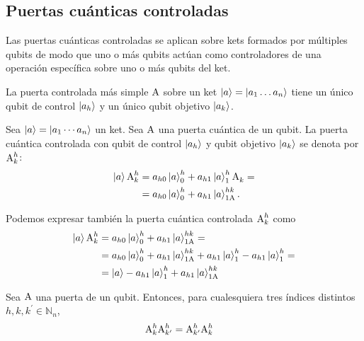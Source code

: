 \subsection{Puertas cuánticas controladas}
Las puertas cuánticas controladas se aplican sobre kets formados por múltiples qubits de modo que uno o más qubits actúan como controladores de una operación específica sobre uno o más qubits del ket.

La puerta controlada más simple $\text{A}$ sobre un ket $\ket{a}=\ket{a_1\dots a_n}$ tiene un único qubit de control $\ket{a_h}$ y un único qubit objetivo $\ket{a_k}$.

\begin{notation}
	Sea $\ket{a}=\ket{a_1\cdots a_n}$ un ket.
	Sea $\text{A}$ una puerta cuántica de un qubit.
	La puerta cuántica controlada con qubit de control $\ket{a_h}$ y qubit objetivo $\ket{a_k}$ se denota por $\text{A}^{h}_{k}$:
	\begin{equation}
	\begin{split}
		\label{eq:generic-controlled-gate}
		\ket{a}\text{A}^{h}_{k}&=a_{h0}\ket{a}^{h}_{0}+a_{h1} \ket{a}^{h}_{1}\text{A}^{}_{k}= \\
		&=a_{h0}\ket{a}^{h}_{0}+a_{h1} \ket{a}^{hk}_{1\text{A}}.
	\end{split}
\end{equation}
\end{notation}

Podemos expresar también la puerta cuántica controlada $\text{A}^{h}_{k}$ como
\begin{align*}
	\ket{a}\text{A}^{h}_{k}&=a_{h0}\ket{a}^{h}_{0}+a_{h1} \ket{a}^{hk}_{1\text{A}}= \\
	&=a_{h0}\ket{a}^{h}_{0}+a_{h1} \ket{a}^{hk}_{1\text{A}}+a_{h1}\ket{a}^{h}_{1}-a_{h1} \ket{a}^{h}_{1}=\\
	&=\ket{a}-a_{h1} \ket{a}^{h}_{1}+a_{h1} \ket{a}^{hk}_{1\text{A}}
\end{align*}

\begin{proposition}
	Sea $\text{A}$ una puerta de un qubit.
	Entonces, para cualesquiera tres índices distintos $h,k,k^\prime \in \mathbb{N}_n$,
	\begin{align}
		\text{A}^{h}_{k}\text{A}^{h}_{k^\prime} &= \text{A}^{h}_{k^\prime}\text{A}^{h}_{k}
	\end{align}
\end{proposition}


